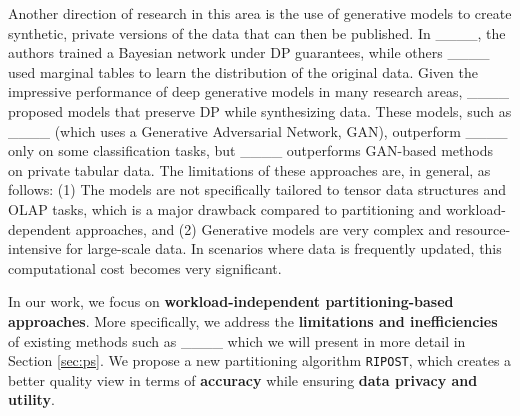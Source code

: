Another direction of research in this area is the use of generative models to create synthetic, private versions of the data that can then be published.  
In ____, the authors trained a Bayesian network under DP guarantees, while others ____ used marginal tables to learn the distribution of the original data.
Given the impressive performance of deep generative models in many research areas, ____ proposed models that preserve DP while synthesizing data. 
These models, such as ____ (which uses a Generative Adversarial Network, GAN), outperform ____ only on some classification tasks, but ____ outperforms GAN-based methods on private tabular data. 
The limitations of these approaches are, in general, as follows: (1) The models are not specifically tailored to tensor data structures and OLAP tasks, which is a major drawback compared to partitioning and workload-dependent approaches, and (2) Generative models are very complex and resource-intensive for large-scale data. In scenarios where data is frequently updated, this computational cost becomes very significant.\medskip

In our work, we focus on \textbf{workload-independent partitioning-based approaches}. 
More specifically, we address the \textbf{limitations and inefficiencies} of existing methods such as ____ which we will present in more detail in Section \ref{sec:ps}. 
We propose a new partitioning algorithm \texttt{RIPOST}, which creates a better quality view in terms of \textbf{accuracy} while ensuring \textbf{data privacy and utility}.


